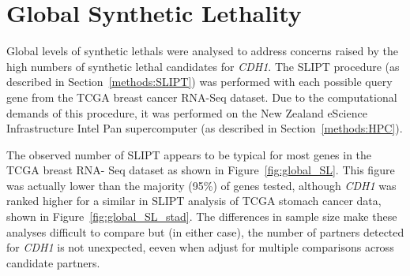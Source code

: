 \FloatBarrier

\iffalse
\section{Global Synthetic Lethality}

Global levels of \glspl{synthetic lethal} were analysed to address concerns raised by the high numbers of \gls{synthetic lethal} candidates for \textit{CDH1}. The \gls{SLIPT} procedure (as described in Section~\ref{methods:SLIPT}) was performed with each possible query gene from the \gls{TCGA} breast cancer \gls{RNA-Seq} dataset. Due to the computational demands of this procedure, it was performed on the New Zealand eScience Infrastructure Intel Pan supercomputer (as described in Section~\ref{methods:HPC}).

The observed number of \gls{SLIPT} appears to be typical for most genes in the \gls{TCGA} breast \acrshort{RNA}- Seq dataset as shown in Figure~\ref{fig:global_SL}. This figure was actually lower than the majority (95\%) of genes tested, although \textit{CDH1} was ranked higher for a similar in \gls{SLIPT} analysis of \gls{TCGA} stomach cancer data, shown in Figure~\ref{fig:global_SL_stad}. The differences in sample size make these analyses difficult to compare but (in either case), the number of partners detected for \textit{CDH1} is not unexpected, eeven when adjust for multiple comparisons across candidate partners.


